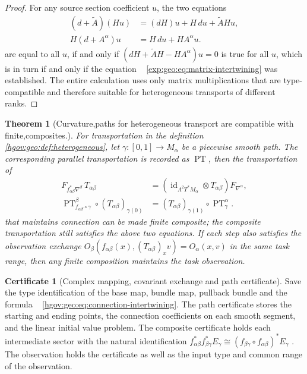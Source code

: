 \documentclass[12pt,a4paper,openany,notitlepage]{report}
\theoremstyle{plain}
\newtheorem{theorem}{Theorem}[chapter]
\theoremstyle{definition}
\newtheorem*{certificate}{Certificate}
\theoremstyle{remark}
\def\mathcal#1{#1}\def\mathsf#1{#1}\def\mathbb#1{#1}%
\begin{document}
\begin{CJK*}
\begin{proof}
For any source section coefficient $u$, the two equations \[
\begin{aligned}
(d+\widetilde A)(Hu)&=(dH)u+H\,du+\widetilde A H u,\\
H(d+A^\alpha)u&=H\,du+H A^\alpha u.
\end{aligned}
\] are equal to all $u$, if and only if $(dH+\widetilde A H-H A^\alpha)u=0$ is true for all $u$, which is in turn if and only if the equation ~ \eqref{exp:geo:eq:matrix-intertwining} was established. The entire calculation uses only matrix multiplications that are type-compatible and therefore suitable for heterogeneous transports of different ranks.\end{proof}


\begin{theorem}
[Curvature,paths for heterogeneous transport are compatible with finite,composites.]\label{hgov:geo:thm:transport}
For transportation in the definition ~ \ref{hgov:geo:def:heterogeneous}, let $\gamma:[0,1]\to M_\alpha$ be a piecewise smooth path. The corresponding parallel transportation is recorded as $\operatorname{PT}$, then the transportation of \begin{align}
\label{hgov:geo:eq:curvature-intertwining}
F_{f_{\alpha\beta}^*\nabla^\beta}\,T_{\alpha\beta}
&=(\operatorname{id}_{\Lambda^2T^*M_\alpha}\otimes T_{\alpha\beta})F_{\nabla^\alpha},\\
\label{hgov:geo:eq:parallel-intertwining}
\operatorname{PT}^{\beta}_{f_{\alpha\beta}\circ\gamma}
\circ(T_{\alpha\beta})_{\gamma(0)}
&=(T_{\alpha\beta})_{\gamma(1)}
\circ\operatorname{PT}^{\alpha}_{\gamma}.
\end{align} that maintains connection can be made finite composite; the composite transportation still satisfies the above two equations. If each step also satisfies the observation exchange $\mathcal O_\beta(f_{\alpha\beta}(x),(T_{\alpha\beta})_xv)=\mathcal O_\alpha(x,v)$ in the same task range, then any finite composition maintains the task observation.\end{theorem}


\begin{certificate}
[Complex mapping, covariant exchange and path certificate]Save the type identification of the base map, bundle map, pullback bundle and the formula ~ \eqref{hgov:geo:eq:connection-intertwining}. The path certificate stores the starting and ending points, the connection coefficients on each smooth segment, and the linear initial value problem. The composite certificate holds each intermediate sector with the natural identification $f_{\alpha\beta}^*f_{\beta\gamma}^*E_\gamma
\cong(f_{\beta\gamma}\circ f_{\alpha\beta})^*E_\gamma$ . The observation holds the certificate as well as the input type and common range of the observation.\end{certificate}



\end{CJK*}
\end{document}
